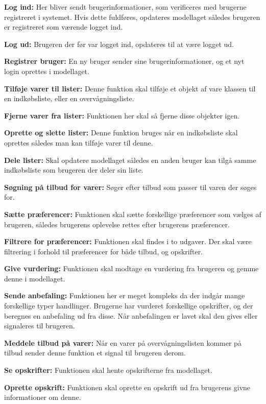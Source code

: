 \textbf{Log ind:} Her bliver sendt brugerinformationer, som verificeres med brugerne registreret i systemet.
Hvis dette fuldføres, opdateres modellaget således brugeren er registreret som værende logget ind.

\textbf{Log ud:} Brugeren der før var logget ind, opdateres til at være logget ud.

\textbf{Registrer bruger:} En ny bruger sender sine brugerinformationer, og et nyt login oprettes i modellaget.

\textbf{Tilføje varer til lister:} Denne funktion skal tilføje et objekt af vare klassen til en indkøbsliste, eller en overvågningsliste.

\textbf{Fjerne varer fra lister:} Funktionen her skal så fjerne disse objekter igen.

\textbf{Oprette og slette lister:} Denne funktion bruges når en indkøbsliste skal oprettes således man kan tilføje varer til denne.

\textbf{Dele lister:} Skal opdatere modellaget således en anden bruger kan tilgå samme indkøbsliste som brugeren der deler sin liste.

\textbf{Søgning på tilbud for varer:} Søger efter tilbud som passer til varen der søges for.

\textbf{Sætte præferencer:} Funktionen skal sætte forskellige præferencer som vælges af brugeren, således brugerens oplevelse rettes efter brugerens præferencer.

\textbf{Filtrere for præferencer:} Funktionen skal findes i to udgaver. Der skal være filtrering i forhold til præferencer for både tilbud, og opskrifter.

\textbf{Give vurdering:} Funktionen skal modtage en vurdering fra brugeren og gemme denne i modellaget.

\textbf{Sende anbefaling:} Funktionen her er meget kompleks da der indgår mange forskellige typer handlinger.
Brugerne har vurderet forskellige opskrifter, og der beregnes en anbefaling ud fra disse.
Når anbefalingen er lavet skal den gives eller signaleres til brugeren.

\textbf{Meddele tilbud på varer:} Når en varer på overvågningslisten kommer på tilbud sender denne funktion et signal til brugeren derom.

\textbf{Se opskrifter:} Funktionen skal hente opskrifterne fra modellaget.

\textbf{Oprette opskrift:} Funktionen skal oprette en opskrift ud fra brugerens givne informationer om denne.

